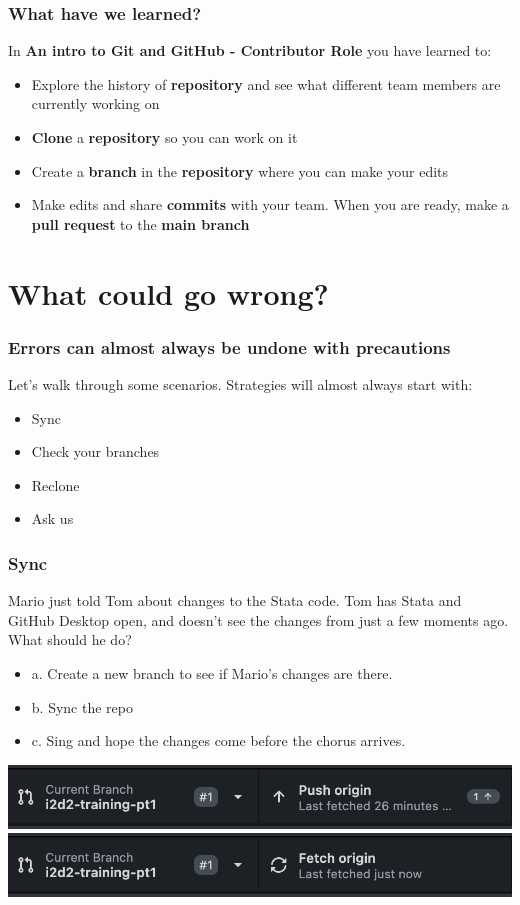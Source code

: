 \documentclass[aspectratio=169]{beamer} %
\begin{document}
\begin{frame}
\frametitle{What have we learned?}

	In \textbf{An intro to Git and GitHub - Contributor Role} you have learned to:

	\begin{itemize}
		\item Explore the history of \textbf{repository} and see what different team members are currently working on
		\item \textbf{Clone} a \textbf{repository} so you can work on it
		\item Create a \textbf{branch} in the \textbf{repository} where you can make your edits
		\item Make edits and share \textbf{commits} with your team. When you are ready, make a \textbf{pull request} to the \textbf{main branch}
	\end{itemize}
\end{frame}


\section{What could go wrong?}


\begin{frame}
\frametitle{Errors can almost always be undone with precautions}

	Let's walk through some scenarios. Strategies will almost always start with:

	\begin{itemize}
		\item Sync
		\item Check your branches
		\item Reclone
		\item Ask us
	\end{itemize}
\end{frame}

\begin{frame}
\frametitle{Sync}

	Mario just told Tom about changes to the Stata code. Tom has Stata and GitHub Desktop open,
	and doesn't see the changes from just a few moments ago. What should he do?
	\begin{itemize}
		\item a. Create a new branch to see if Mario's changes are there.
		\item b. Sync the repo
		\item c. Sing and hope the changes come before the chorus arrives.
	\end{itemize}

\includegraphics[width=1\linewidth]{img/desktop_push}
\includegraphics[width=1\linewidth]{img/desktop_sync}

\end{frame}
\end{document}
